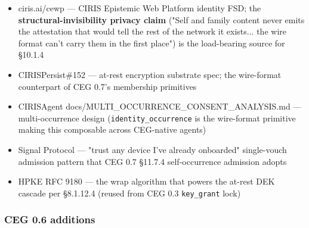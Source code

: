 \documentclass[10pt]{article}
\begin{document}
\begin{itemize}\setlength\itemsep{0pt}
\item ciris.ai/cewp — CIRIS Epistemic Web Platform identity FSD; the \textbf{structural-invisibility privacy claim} ("Self and family content never emits the attestation that would tell the rest of the network it exists... the wire format can't carry them in the first place") is the load-bearing source for §10.1.4
\item CIRISPersist\#152 — at-rest encryption substrate spec; the wire-format counterpart of CEG 0.7's membership primitives
\item CIRISAgent docs/MULTI\_OCCURRENCE\_CONSENT\_ANALYSIS.md — multi-occurrence design (\texttt{identity\_occurrence} is the wire-format primitive making this composable across CEG-native agents)
\item Signal Protocol — "trust any device I've already onboarded" single-vouch admission pattern that CEG 0.7 §11.7.4 self-occurrence admission adopts
\item HPKE RFC 9180 — the wrap algorithm that powers the at-rest DEK cascade per §8.1.12.4 (reused from CEG 0.3 \texttt{key\_grant} lock)
\end{itemize}


\subsubsection*{CEG 0.6 additions}
\end{document}
